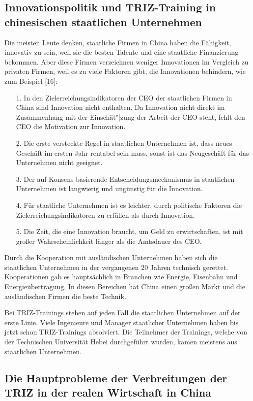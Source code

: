 \documentclass[11pt,a4paper]{article}
\begin{document}
\subsection{Innovationspolitik und TRIZ-Training in chinesischen staatlichen
  Unternehmen}  

Die meisten Leute denken, staatliche Firmen in China haben die Fähigkeit,
innovativ zu sein, weil sie die besten Talente und eine staatliche
Finanzierung bekommen. Aber diese Firmen verzeichnen weniger Innovationen im
Vergleich zu privaten Firmen, weil es zu viele Faktoren gibt, die Innovationen
behindern, wie zum Beispiel [16]:
\begin{itemize}
\item[1.] In den Zielerreichungsindikatoren der CEO der staatlichen Firmen in
  China sind Innovation nicht enthalten. Da Innovation nicht direkt im
  Zusammenhang mit der Einschät"|zung der Arbeit der CEO steht, fehlt den CEO
  die Motivation zur Innovation.
\item[2.] Die erste versteckte Regel in staatlichen Unternehmen ist, dass
  neues Geschäft im ersten Jahr rentabel sein muss, sonst ist das Neugeschäft
  für das Unternehmen nicht geeignet.
\item[3.] Der auf Konsens basierende Entscheidungsmechanismus in staatlichen
  Unternehmen ist langwierig und ungünstig für die Innovation.
\item[4.]  Für staatliche Unternehmen ist es leichter, durch politische
  Faktoren die Zielerreichungsindikatoren zu erfüllen als durch Innovation.
\item[5.] Die Zeit, die eine Innovation braucht, um Geld zu erwirtschaften,
  ist mit großer Wahrscheinlichkeit länger als die Amtsdauer des CEO.
\end{itemize}
Durch die Kooperation mit ausländischen Unternehmen haben sich die staatlichen
Unternehmen in der vergangenen 20 Jahren technisch gerettet.  Kooperationen
gab es hauptsächlich in Branchen wie Energie, Eisenbahn und
Energieübertragung. In diesen Bereichen hat China einen großen Markt und die
ausländischen Firmen die beste Technik.

Bei TRIZ-Trainings stehen auf jeden Fall die staatlichen Unternehmen auf der
erste Linie. Viele Ingenieure und Manager staatlicher Unternehmen haben bis
jetzt schon TRIZ-Trainings absolviert. Die Teilnehmer der Trainings, welche
von der Technischen Universität Hebei durchgeführt wurden, kamen meistens aus
staatlichen Unternehmen.

\subsection{Die Hauptprobleme der Verbreitungen der TRIZ in der realen
  Wirtschaft in China} 
\end{document}

